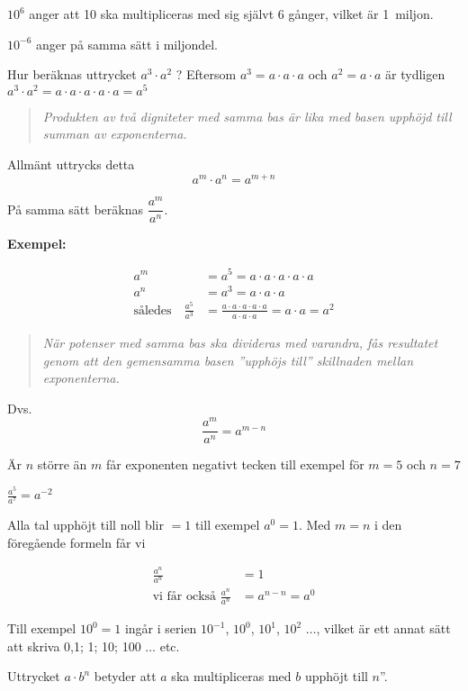 \(10^6\) anger att 10 ska multipliceras med sig självt 6 gånger, vilket är
1~miljon.

\(10^{-6}\) anger på samma sätt i miljondel.

Hur beräknas uttrycket \(a^3 \cdot a^2\) ?
Eftersom \(a^3 = a \cdot a \cdot a\) och \(a^2 = a \cdot a\) är tydligen
\(a^3 \cdot a^2 = a \cdot a \cdot a \cdot a \cdot a = a^5\)

\begin{quote}\emph{Produkten av två digniteter med samma bas är lika med basen
    upphöjd till summan av exponenterna.}\end{quote}

Allmänt uttrycks detta \[a^m \cdot a^n = a^{m+n}\]

På samma sätt beräknas \(\dfrac{a^m}{a^n}\).

\textbf{Exempel:}

\begin{align*}
a^m &= a^5 = a \cdot a \cdot a \cdot a \cdot a \\
a^n &= a^3 = a \cdot a \cdot a \\
\text{således} \quad
\frac{a^5}{a^3}&=\frac{a \cdot a \cdot a \cdot a \cdot a}{a \cdot a \cdot a} =
a \cdot a = a^2
\end{align*}

\begin{quote}\emph{När potenser med samma bas ska divideras med varandra, fås
resultatet genom att den gemensamma basen ''upphöjs till'' skillnaden mellan
exponenterna.}\end{quote}

Dvs. \[\frac{a^m}{a^n} = a^{m-n}\]

Är \(n\) större än \(m\) får exponenten negativt tecken till exempel för \(m = 5\) och
\(n = 7\)

\(\frac{a^5}{a^7} = a^{-2}\)

Alla tal upphöjt till noll blir \(= 1\) till exempel \(a^0 = 1\).
Med \(m = n\) i den föregående formeln får vi

\begin{align*}
  \frac{a^n}{a^n} &= 1 \\
  \text{vi får också }\frac{a^n}{a^n} &= a^{n-n} =a^0
\end{align*}

Till exempel \(10^0 = 1\) ingår i serien \(10^{-1}\), \(10^0\), \(10^1\), \(10^2\)
\(\ldots\), vilket är ett annat sätt att skriva 0,1; 1; 10; 100 \(\ldots\) etc.

Uttrycket \(a \cdot b^n\) betyder att \(a\) ska multipliceras med \(b\) upphöjt
till \(n\)''.

